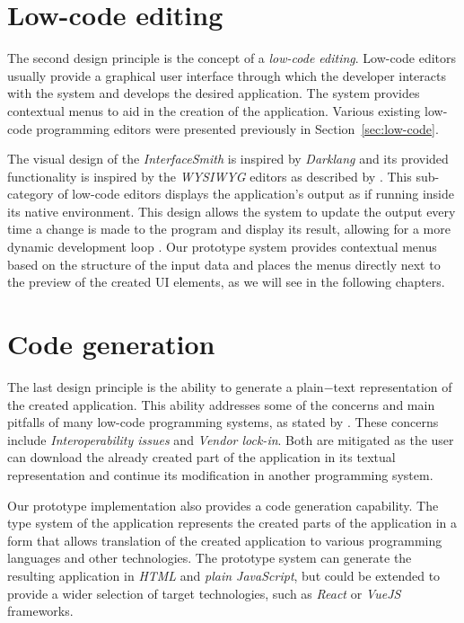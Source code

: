 \section{Low-code editing}

The second design principle is the concept of a \emph{low-code editing}.
Low-code editors usually provide a graphical user interface through which the developer interacts with the system and develops the desired application.
The system provides contextual menus to aid in the creation of the application.
Various existing low-code programming editors were presented previously in Section~\ref{sec:low-code}.


The visual design of the \emph{InterfaceSmith} is inspired by \emph{Darklang} and its provided functionality is inspired by the \emph{WYSIWYG} editors as described by \citet{Yang_Gupta_Botev_Churchill_Levchenko_Shanmugasundaram_2008}.
This sub-category of low-code editors displays the application's output as if running inside its native environment.
This design allows the system to update the output every time a change is made to the program and display its result, allowing for a more dynamic development loop \cite{output-directed-programming}.
Our prototype system provides contextual menus based on the structure of the input data and places the menus directly next to the preview of the created UI elements, as we will see in the following chapters.

\section{Code generation}

The last design principle is the ability to generate a plain−text representation of the created application.
This ability addresses some of the concerns and main pitfalls of many low-code programming systems, as stated by \citet{Pinho_Aguiar_Amaral_2023}.
These concerns include \emph{Interoperability issues} and \emph{Vendor lock-in}.
Both are mitigated as the user can download the already created part of the application in its textual representation and continue its modification in another programming system.

Our prototype implementation also provides a code generation capability.
The type system of the application represents the created parts of the application in a form that allows translation of the created application to various programming languages and other technologies.
The prototype system can generate the resulting application in \emph{HTML} and \emph{plain JavaScript}, but could be extended to provide a wider selection of target technologies,
such as \emph{React} or \emph{VueJS} frameworks.
